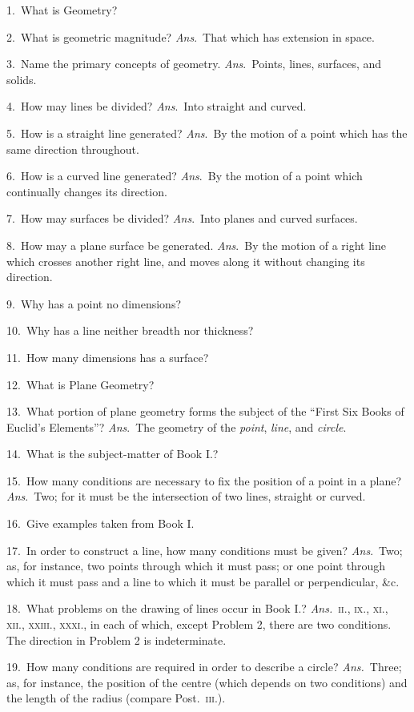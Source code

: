 \documentclass[oneside]{book}
\begin{document}
\begin{footnotesize}
1.~What is Geometry?

2.~What is geometric magnitude? \emph{Ans}.~That which has extension
in space.

3.~Name the primary concepts of geometry. \emph{Ans}.~Points,
lines, surfaces, and solids.

4.~How may lines be divided? \emph{Ans}.~Into straight and curved.

5.~How is a straight line generated? \emph{Ans}.~By the motion of
a point which has the same direction throughout.

6.~How is a curved line generated? \emph{Ans}.~By the motion of a
point which continually changes its direction.

7.~How may surfaces be divided? \emph{Ans}.~Into planes and
curved surfaces.

8.~How may a plane surface be generated. \emph{Ans}.~By the
motion of a right line which crosses another right line, and
moves along it without changing its direction.

9.~Why has a point no dimensions?

10.~Why has a line neither breadth nor thickness?

11.~How many dimensions has a surface?

12.~What is Plane Geometry?

13.~What portion of plane geometry forms the subject of the
``First Six Books of Euclid's Elements''? \emph{Ans}.~The geometry
of the \emph{point}, \emph{line}, and \emph{circle}.

14.~What is the subject-matter of Book I.?

15.~How many conditions are necessary to fix the position of a
point in a plane? \emph{Ans}.~Two; for it must be the intersection of
two lines, straight or curved.

16.~Give examples taken from Book I.

17.~In order to construct a line, how many conditions must be
given? \textit{Ans}.\ Two; as, for instance, two points through which
it must pass; or one point through which it must pass and a line
to which it must be parallel or perpendicular, \&c.

18.~What problems on the drawing of lines occur in Book I.?
\textit{Ans.}\ \textsc{ii., ix., xi., xii., xxiii., xxxi.,} in each of which, except
Problem 2, there are two conditions. The direction in
Problem 2 is indeterminate.

19.~How many conditions are required in order to describe a
circle? \textit{Ans.}\ Three; as, for instance, the position of the centre
(which depends on two conditions) and the length of the radius
(compare Post.\ \textsc{iii.}).


\end{footnotesize}
\end{document}
